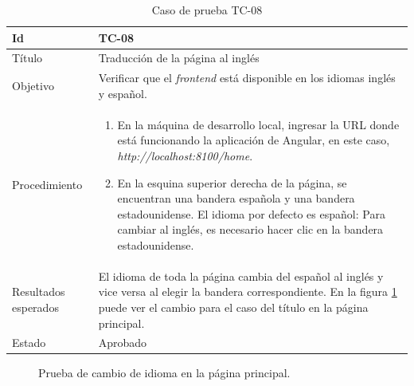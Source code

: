 \begin{table}[H]
    \begin{tabularx}{\textwidth}{|m{3cm}|X|}
    \hline
    Id & TC-08\\
    \hline
    Título & Traducción de la página al inglés\\
    \hline
    Objetivo & Verificar que el \textit{frontend} está disponible en los idiomas inglés y español.\\
    \hline
    Procedimiento & \begin{enumerate}
    \item En la máquina de desarrollo local, ingresar la URL donde está funcionando la aplicación de Angular, en este caso, \textit{http://localhost:8100/home}.
    \item En la esquina superior derecha de la página, se encuentran una bandera española y una bandera estadounidense. El idioma por defecto es español: Para cambiar al inglés, es necesario hacer clic en la bandera estadounidense.
    \end{enumerate}\\
    \hline
    Resultados esperados & El idioma de toda la página cambia del español al inglés y vice versa al elegir la bandera correspondiente. En la figura \ref{fig:language_change} puede ver el cambio para el caso del título en la página principal.\\
    \hline
    Estado & Aprobado\\
    \hline
    \end{tabularx}
    \caption{Caso de prueba TC-08}
    \end{table}

    \begin{figure}[H]
        \caption{Prueba de cambio de idioma en la página principal.}
        \label{fig:language_change}
    \end{figure}

